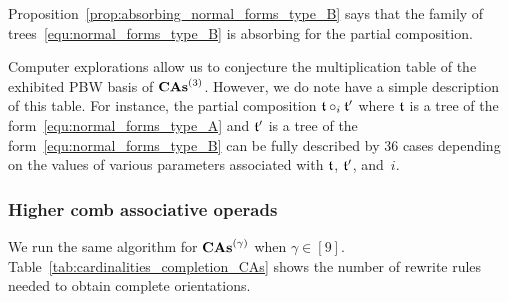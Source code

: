 Proposition~\ref{prop:absorbing_normal_forms_type_B} says that the
family of trees~\eqref{equ:normal_forms_type_B} is absorbing
for the partial composition.
\medbreak

Computer explorations allow us to conjecture the multiplication table
of the exhibited PBW basis of $\mathbf{CAs}^{\left(3\right)}$. However, we do note have a
simple description of this table. For instance, the partial composition
$\mathfrak{t}\circ_i\mathfrak{t}'$ where $\mathfrak{t}$ is a tree of the
form~\eqref{equ:normal_forms_type_A} and $\mathfrak{t}'$ is a tree of the
form~\eqref{equ:normal_forms_type_B} can be fully described by $36$
cases depending on the values of various parameters associated with
$\mathfrak{t}$, $\mathfrak{t}'$, and~$i$.
\medbreak

\subsubsection{Higher comb associative operads}
\label{sec:higher_comb_associative_operads}

We run the same algorithm for $\mathbf{CAs}^{\left(\gamma\right)}$ when $\gamma \in [9]$.
Table~\ref{tab:cardinalities_completion_CAs} shows
the number of rewrite rules needed to obtain complete orientations.
\medbreak

